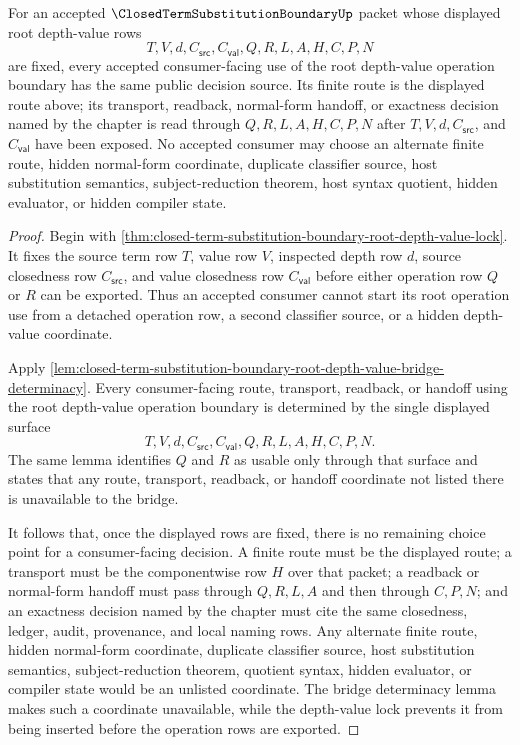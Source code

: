 
\begin{corollary}
\label{cor:closed-term-substitution-boundary-root-depth-value-consumer-determinacy}
For an accepted $\ClosedTermSubstitutionBoundaryUp$ packet whose displayed root depth-value rows
$$
T,V,d,C_{\mathsf{src}},C_{\mathsf{val}},Q,R,L,A,H,C,P,N
$$
are fixed, every accepted consumer-facing use of the root depth-value operation boundary has the same public decision source. Its finite route is the displayed route above; its transport, readback, normal-form handoff, or exactness decision named by the chapter is read through $Q,R,L,A,H,C,P,N$ after $T,V,d,C_{\mathsf{src}}$, and $C_{\mathsf{val}}$ have been exposed. No accepted consumer may choose an alternate finite route, hidden normal-form coordinate, duplicate classifier source, host substitution semantics, subject-reduction theorem, host syntax quotient, hidden evaluator, or hidden compiler state.
\end{corollary}
\begin{proof}
Begin with \autoref{thm:closed-term-substitution-boundary-root-depth-value-lock}. It fixes the source term row $T$, value row $V$, inspected depth row $d$, source closedness row $C_{\mathsf{src}}$, and value closedness row $C_{\mathsf{val}}$ before either operation row $Q$ or $R$ can be exported. Thus an accepted consumer cannot start its root operation use from a detached operation row, a second classifier source, or a hidden depth-value coordinate.

Apply \autoref{lem:closed-term-substitution-boundary-root-depth-value-bridge-determinacy}. Every consumer-facing route, transport, readback, or handoff using the root depth-value operation boundary is determined by the single displayed surface
$$
T,V,d,C_{\mathsf{src}},C_{\mathsf{val}},Q,R,L,A,H,C,P,N.
$$
The same lemma identifies $Q$ and $R$ as usable only through that surface and states that any route, transport, readback, or handoff coordinate not listed there is unavailable to the bridge.

It follows that, once the displayed rows are fixed, there is no remaining choice point for a consumer-facing decision. A finite route must be the displayed route; a transport must be the componentwise row $H$ over that packet; a readback or normal-form handoff must pass through $Q,R,L,A$ and then through $C,P,N$; and an exactness decision named by the chapter must cite the same closedness, ledger, audit, provenance, and local naming rows. Any alternate finite route, hidden normal-form coordinate, duplicate classifier source, host substitution semantics, subject-reduction theorem, quotient syntax, hidden evaluator, or compiler state would be an unlisted coordinate. The bridge determinacy lemma makes such a coordinate unavailable, while the depth-value lock prevents it from being inserted before the operation rows are exported.
\end{proof}
